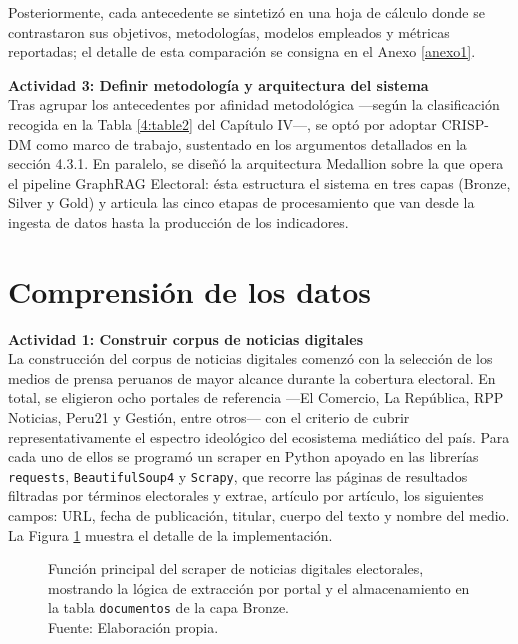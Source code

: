 Posteriormente, cada antecedente se sintetizó en una hoja de cálculo donde se
contrastaron sus objetivos, metodologías, modelos empleados y métricas reportadas;
el detalle de esta comparación se consigna en el Anexo \ref{anexo1}.

\textbf{Actividad 3: Definir metodología y arquitectura del sistema}
\\
Tras agrupar los antecedentes por afinidad metodológica —según la clasificación
recogida en la Tabla \ref{4:table2} del Capítulo IV—, se optó por adoptar CRISP-DM
como marco de trabajo, sustentado en los argumentos detallados en la sección 4.3.1.
En paralelo, se diseñó la arquitectura Medallion sobre la que opera el pipeline
GraphRAG Electoral: ésta estructura el sistema en tres capas (Bronze, Silver y
Gold) y articula las cinco etapas de procesamiento que van desde la ingesta de
datos hasta la producción de los indicadores.

\section{Comprensión de los datos}

\textbf{Actividad 1: Construir corpus de noticias digitales}
\\
La construcción del corpus de noticias digitales comenzó con la selección de los
medios de prensa peruanos de mayor alcance durante la cobertura electoral. En
total, se eligieron ocho portales de referencia —El Comercio, La República, RPP
Noticias, Peru21 y Gestión, entre otros— con el criterio de cubrir
representativamente el espectro ideológico del ecosistema mediático del país. Para
cada uno de ellos se programó un scraper en Python apoyado en las librerías
\texttt{requests}, \texttt{BeautifulSoup4} y \texttt{Scrapy}, que recorre las
páginas de resultados filtradas por términos electorales y extrae, artículo por
artículo, los siguientes campos: URL, fecha de publicación, titular, cuerpo del
texto y nombre del medio. La Figura \ref{5:fig1} muestra el detalle de la
implementación.

\begin{figure}[!ht]
    \begin{center}
        
        \caption[Función principal del scraper de noticias digitales electorales]{Función principal del scraper de noticias digitales electorales, mostrando la lógica de extracción por portal y el almacenamiento en la tabla \texttt{documentos} de la capa Bronze.\\Fuente: Elaboración propia.}
        \label{5:fig1}
    \end{center}
\end{figure}

